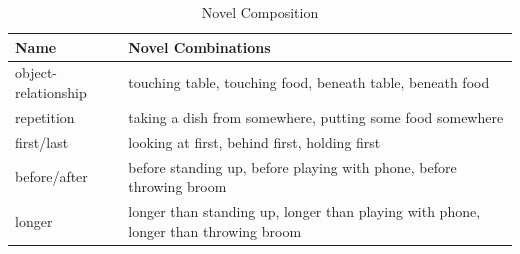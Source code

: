 \documentclass[10pt,twocolumn,letterpaper]{article}
\begin{document}
\begin{table}[]
    \begin{center}
    \caption{Novel Composition}
    \label{novel_composition_table}
    \begin{tabular}{|p{2cm}|p{5cm}|}
    \hline
    \textbf{Name} & \textbf{Novel Combinations} \\
    \hline
    object-relationship & touching table, touching food, beneath table, beneath food\\
    \hline
    repetition & taking a dish from somewhere, putting some food somewhere\\
    \hline
    first/last & looking at first, behind first, holding first \\
    \hline
    before/after & before standing up, before playing with phone, before throwing broom\\
    \hline
    longer & longer than standing up, longer than playing with phone, longer than throwing broom\\
    \hline
    
    \end{tabular}
    
    \end{center}
\end{table}

{\small


}
\end{document}
